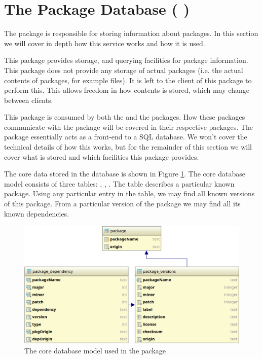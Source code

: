 \section{The Package Database ( \regdb)}
\label{sec:regdb}

The \regdb package is responsible for storing information about packages. In
this section we will cover in depth how this service works and how it is used.

This package provides storage, and querying facilities for package information.
This package does not provide any storage of actual packages (i.e. the actual
contents of packages, for example  files). It is left to the client
of this package to perform this. This allows freedom in how contents is stored,
which may change between clients.

This package is consumed by both the \registry and the \cache packages. How
these packages communicate with the \regdb package will be covered in their
respective packages. The \regdb package essentially acts as a front-end to a
SQL database. We won't cover the technical details of how this works, but for
the remainder of this section we will cover what is stored and which facilities
this package provides.

The core data stored in the database is shown in Figure
\ref{fig:registry_database}. The core database model consists of three tables:
, , . The
 table describes a particular known package. Using any particular
entry in the  table, we may find all known versions of this
package. From a particular version of the package we may find all its known
dependencies.

\begin{figure}[H]
    \centering
    \includegraphics[width=1.0\textwidth]{pictures/regdb.png}
    \caption{The core database model used in the \regdb package}
    \label{fig:registry_database}
\end{figure}

